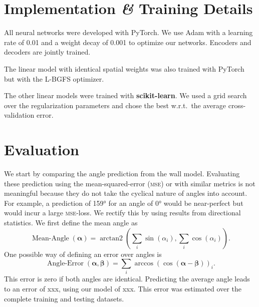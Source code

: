 \documentclass[nobib]{tufte-handout}
\begin{document}
\section{Implementation \textit{\&} Training Details}
All neural networks were developed with PyTorch.
We use Adam with a learning rate of 0.01 and a weight decay of 0.001 to optimize our networks\autocite{adam}.
Encoders and decoders are jointly trained.

The linear model with identical spatial weights was also trained with PyTorch but with the \textsc{L-BGFS} optimizer.

The other linear models were trained with \textbf{scikit-learn}\autocite{scikitLearn}.
We used a grid search over the regularization parameters and chose the best w.r.t.\ the average cross-validation error.

\section{Evaluation}
We start by comparing the angle prediction from the wall model.
Evaluating these prediction using the mean-squared-error (\textsc{mse}) or with similar metrics is not meaningful because they do not take the cyclical nature of angles into account.
For example, a prediction of \ang{159} for an angle of \ang{0} would be near-perfect but would incur a large \textsc{mse}-loss.
We rectify this by using results from directional statistics\autocite{circularStatistics}.
We first define the mean angle as
\begin{equation*}
 \operatorname{Mean-Angle}(\bm{\alpha}) = \operatorname{arctan2} \left( \sum_i \sin \left( \alpha_i \right),  \sum_i \cos \left( \alpha_i \right)  \right).
\end{equation*}
One possible way of defining an error over angles is
\begin{equation*}
 \operatorname{Angle-Error}(\bm{\alpha}, \bm{\beta}) = \sum_i \operatorname{arccos} \left(  \cos  (\bm{\alpha} - \bm{\beta})  \right)_i.
\end{equation*}
This error is zero if both angles are identical.
Predicting the average angle leads to an error of xxx, using our model of xxx.
This error was estimated over the complete training and testing datasets.
\end{document}

